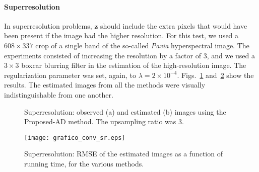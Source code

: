 \documentclass[10pt,twocolumn,twoside]{IEEEtran}
\newcommand{\z}{\mathbf{z}} %
\begin{document}
\paragraph{Superresolution} In superresolution problems, $\z$ should include the extra pixels that would have been present if the image had the higher resolution. For this test, we used a $608 \times 337$ crop of a single band of the so-called \emph{Pavia} hyperspectral image. The experiments consisted of increasing the resolution by a factor of 3, and we used a $3 \times 3$ boxcar blurring filter in the estimation of the high-resolution image. The regularization parameter was set, again, to $\lambda = 2 \times 10^{-4}$. Figs.~\ref{fig:pavia_sr} and~\ref{fig:grafico_conv_sr} show the results. The estimated images from all the methods were visually indistinguishable from one another.

\begin{figure}[!t]
	\centering
	\hfil
	\caption{Superresolution: observed (a) and estimated (b) images using the Proposed-AD method. The upsampling ratio was 3.}
	\label{fig:pavia_sr}
\end{figure}

\begin{figure}[!t]
	\centering
	\texttt{[image: grafico\_conv\_sr.eps]}%
	\caption{Superresolution: RMSE of the estimated images as a function of running time, for the various methods.}	
	\label{fig:grafico_conv_sr}
\end{figure}
\end{document}
